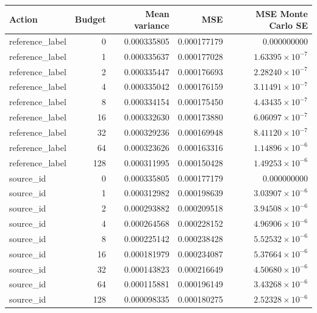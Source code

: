 \begingroup\small
\setlength{\tabcolsep}{4pt}
\begin{longtable}{lrrrr}
\toprule

Action & Budget & Mean variance & MSE & MSE Monte Carlo SE\\\midrule\endhead

reference\_label & 0 & 0.000335805 & 0.000177179 & 0.000000000\\

reference\_label & 1 & 0.000335637 & 0.000177028 & $1.63395\times10^{-7}$\\

reference\_label & 2 & 0.000335447 & 0.000176693 & $2.28240\times10^{-7}$\\

reference\_label & 4 & 0.000335042 & 0.000176159 & $3.11491\times10^{-7}$\\

reference\_label & 8 & 0.000334154 & 0.000175450 & $4.43435\times10^{-7}$\\

reference\_label & 16 & 0.000332630 & 0.000173880 & $6.06097\times10^{-7}$\\

reference\_label & 32 & 0.000329236 & 0.000169948 & $8.41120\times10^{-7}$\\

reference\_label & 64 & 0.000323626 & 0.000163316 & $1.14896\times10^{-6}$\\

reference\_label & 128 & 0.000311995 & 0.000150428 & $1.49253\times10^{-6}$\\

source\_id & 0 & 0.000335805 & 0.000177179 & 0.000000000\\

source\_id & 1 & 0.000312982 & 0.000198639 & $3.03907\times10^{-6}$\\

source\_id & 2 & 0.000293882 & 0.000209518 & $3.94508\times10^{-6}$\\

source\_id & 4 & 0.000264568 & 0.000228152 & $4.96906\times10^{-6}$\\

source\_id & 8 & 0.000225142 & 0.000238428 & $5.52532\times10^{-6}$\\

source\_id & 16 & 0.000181979 & 0.000234087 & $5.37664\times10^{-6}$\\

source\_id & 32 & 0.000143823 & 0.000216649 & $4.50680\times10^{-6}$\\

source\_id & 64 & 0.000115881 & 0.000196149 & $3.43268\times10^{-6}$\\

source\_id & 128 & 0.000098335 & 0.000180275 & $2.52328\times10^{-6}$\\

\bottomrule
\end{longtable}
\endgroup

